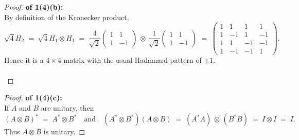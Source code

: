 \documentclass[lang=cn,11pt]{elegantbook}
\begin{document}
\begin{proof}
    \textbf{of 1(4)(b):}\\
By definition of the Kronecker product,
\[
  \sqrt{4}H_2 \;=\;  \sqrt{4}   H_1\otimes H_1
  \;=\;\frac{4}{\sqrt{2}}
  \begin{pmatrix}
    1 & 1\\
    1 & -1
  \end{pmatrix}
  \,\otimes\,
  \frac{1}{\sqrt{2}}
  \begin{pmatrix}
    1 & 1\\
    1 & -1
  \end{pmatrix}
  \;=\;
  \begin{pmatrix}
    1 & 1 & 1 & 1\\
    1 & -1 & 1 & -1\\
    1 & 1 & -1 & -1\\
    1 & -1 & -1 & 1
  \end{pmatrix}.
\]
Hence it is a \(4\times 4\) matrix with the usual Hadamard pattern of \(\pm1\).\\\\
\end{proof}

\begin{proof}
    \textbf{of 1(4)(c):} \\

If \(A\) and \(B\) are unitary, then 
\[
  (A\otimes B)^* \;=\;A^*\otimes B^*
  \quad\text{and}\quad
  (A^*\otimes B^*)(A\otimes B)
  \;=\;(A^*A)\,\otimes\,(B^*B)
  \;=\;I\otimes I
  \;=\;I.
\]
Thus \(A\otimes B\) is unitary.
\end{proof}
\end{document}
